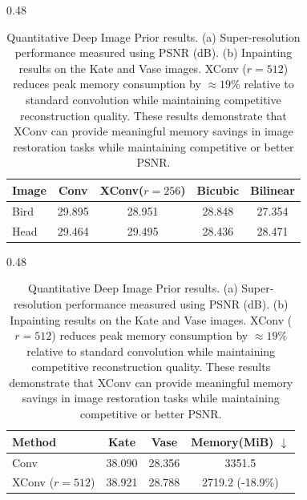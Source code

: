 \documentclass[10pt]{article}
\begin{document}
\begin{table}[t]
\centering

\begin{subtable}[t]{0.48\linewidth}
\centering
\small
\caption{Super-resolution PSNR (dB).}
\label{tab:psnr_super_res}
\begin{tabular}{lcccc}
\toprule
Image & Conv & XConv($r=256$) & Bicubic & Bilinear \\
\midrule
Bird & 29.895 & 28.951 & 28.848 & 27.354 \\
Head & 29.464 & 29.495 & 28.436 & 28.471 \\
\bottomrule
\end{tabular}
\end{subtable}
\hfill
\begin{subtable}[t]{0.48\linewidth}
\centering
\small
\caption{Inpainting PSNR (dB).}
\label{tab:psnr_inpaint}
\begin{tabular}{lccc}
\toprule
Method & Kate & Vase & Memory(MiB) $\downarrow$ \\
\midrule
Conv & 38.090 & 28.356 & 3351.5 \\
XConv ($r=512$) & 38.921 & 28.788 & 2719.2 (-18.9\%) \\
\bottomrule
\end{tabular}
\end{subtable}

\caption{
Quantitative Deep Image Prior results.
(a) Super-resolution performance measured using PSNR (dB).  
(b) Inpainting results on the Kate and Vase images. XConv ($r=512$) reduces peak memory consumption by  $\approx19\%$ relative to standard convolution while maintaining competitive reconstruction quality. These results demonstrate that XConv can provide meaningful memory savings in image restoration tasks while maintaining competitive or better PSNR.}
\label{tab:dip_results}
\end{table}
\end{document}
